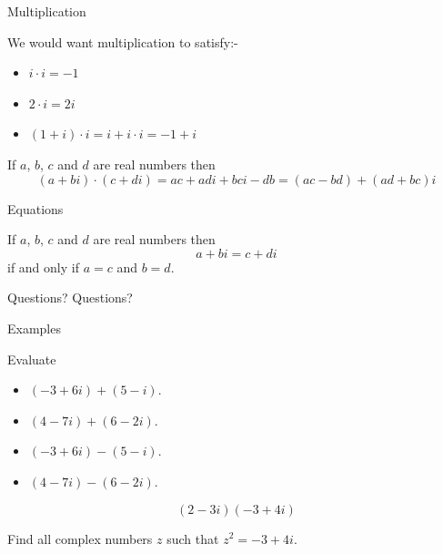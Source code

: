 \documentclass{beamer}
\begin{document}
\begin{frame}{Multiplication}
\begin{example}
We would want multiplication to satisfy:-
	\begin{itemize}
		\item $i\cdot i = -1$
		\item $2\cdot i = 2i$
		\item $(1+i)\cdot i = i+i\cdot i = -1+i$
	\end{itemize}
\end{example}
\begin{definition}
If $a$, $b$, $c$ and $d$ are real numbers then
\begin{equation*}
(a+bi)\cdot(c+di) = ac+adi+bci-db = (ac-bd)+(ad+bc)i
\end{equation*}
\end{definition}
\end{frame}


\begin{frame}{Equations}
\begin{definition}
If $a$, $b$, $c$ and $d$ are real numbers then
\begin{equation*}
a+bi = c+di
\end{equation*}
if and only if $a=c$ and $b=d$.
\end{definition}
\end{frame}


\begin{frame}{Questions?}
Questions?
\end{frame}

\begin{frame}{Examples}
\begin{example}
Evaluate
\begin{itemize}
\item $(-3+6i) + (5-i)$.
\item $(4-7i) + (6-2i)$.
\item $(-3+6i) - (5-i)$.
\item $(4-7i) - (6-2i)$.
\end{itemize}
\end{example}
\begin{example}
\begin{equation*} 
(2-3i)(-3+4i) 
\end{equation*}
\end{example}
\begin{example}
Find all complex numbers $z$ such that $z^2 = -3+4i$.
\end{example}
\end{frame}
\end{document}
